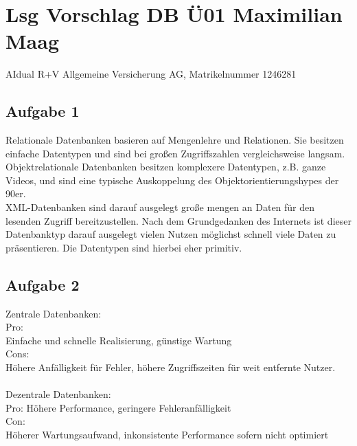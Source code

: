\documentclass{article}
\begin{document}
	\section*{Lsg Vorschlag DB Ü01 Maximilian Maag}
	AIdual R+V Allgemeine Versicherung AG, Matrikelnummer 1246281
	\subsection*{Aufgabe 1}
	Relationale Datenbanken basieren auf Mengenlehre und Relationen. Sie besitzen einfache Datentypen und sind bei großen Zugriffszahlen vergleichsweise langsam. \\
	Objektrelationale Datenbanken besitzen komplexere Datentypen, z.B. ganze Videos, und sind eine typische Auskoppelung des Objektorientierungshypes der 90er. \\
	XML-Datenbanken sind darauf ausgelegt große mengen an Daten für den lesenden Zugriff bereitzustellen. Nach dem Grundgedanken des Internets ist dieser Datenbanktyp darauf ausgelegt vielen Nutzen möglichst schnell viele Daten zu präsentieren. Die Datentypen sind hierbei eher primitiv.
	\subsection*{Aufgabe 2}
	Zentrale Datenbanken: \\
	Pro: \\
	Einfache und schnelle Realisierung, günstige Wartung \\
	Cons: \\
	Höhere Anfälligkeit für Fehler, höhere Zugriffszeiten für weit entfernte Nutzer. \\ \\
	Dezentrale Datenbanken: \\
	Pro:
	Höhere Performance, geringere Fehleranfälligkeit \\
	Con: \\
	Höherer Wartungsaufwand, inkonsistente Performance sofern nicht optimiert
\end{document}
